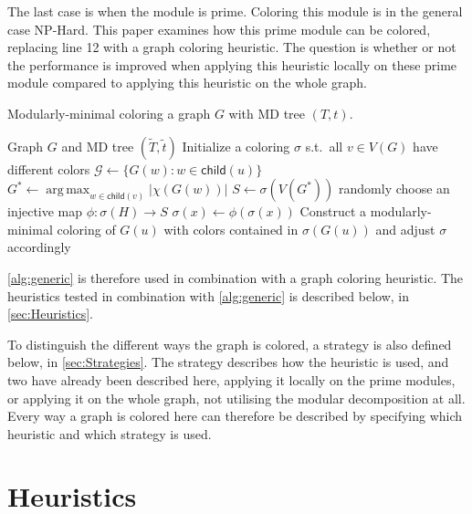 \documentclass[a4paper]{article}
\newcommand{\child}{\mathsf{child}}
\DeclareMathOperator*{\argmax}{arg\,max}
\newcommand{\T}{\widetilde{T}}
\renewcommand{\t}{\widetilde{t}}
\begin{document}
The last case is when the module is prime. Coloring this module is in the
general case NP-Hard. This paper examines how this prime module can be colored,
replacing line 12 with a graph coloring heuristic. The question is whether or
not the performance is improved when applying this heuristic locally on these
prime module compared to applying this heuristic on the whole graph.

\begin{algorithm}[H]
  \caption{Modularly-minimal coloring a graph $G$ with MD tree $(T,t)$.}
  \label{alg:generic}
  \begin{algorithmic}[1]
    \REQUIRE Graph $G$ and MD tree $(\T,\t)$
    \STATE Initialize a coloring $\sigma$ s.t.\ all $v \in V(G)$
           have different colors
          \STATE $\mathcal{G} \leftarrow \{G(w)\colon w\in\child(u)\}$ 
          \STATE $G^* \leftarrow \argmax_{w\in\child(v)} |\chi(G(w))|$
          \STATE $S \leftarrow \sigma(V(G^*))$ 
             \STATE randomly choose an injective map $\phi:\sigma(H)\to S$
                \STATE $\sigma(x)\leftarrow \phi(\sigma(x))$  
             \ENDFOR
          \ENDFOR
          \STATE Construct a modularly-minimal coloring of $G(u)$
              with colors contained in $\sigma(G(u))$
              and adjust $\sigma$ accordingly 
       \ENDIF
    \ENDFOR
  \end{algorithmic}
\end{algorithm}

\autoref{alg:generic} is therefore used in combination with a graph coloring
heuristic. The heuristics tested in combination with \autoref{alg:generic} is
described below, in \autoref{sec:Heuristics}.

To distinguish the different ways the graph is colored, a strategy is also
defined below, in \autoref{sec:Strategies}.  The strategy describes how the
heuristic is used, and two have already been described here, applying it locally
on the prime modules, or applying it on the whole graph, not utilising the
modular decomposition at all. Every way a graph is colored here can therefore be
described by specifying which heuristic and which strategy is used.

\section{Heuristics}
\label{sec:Heuristics}
\end{document}
